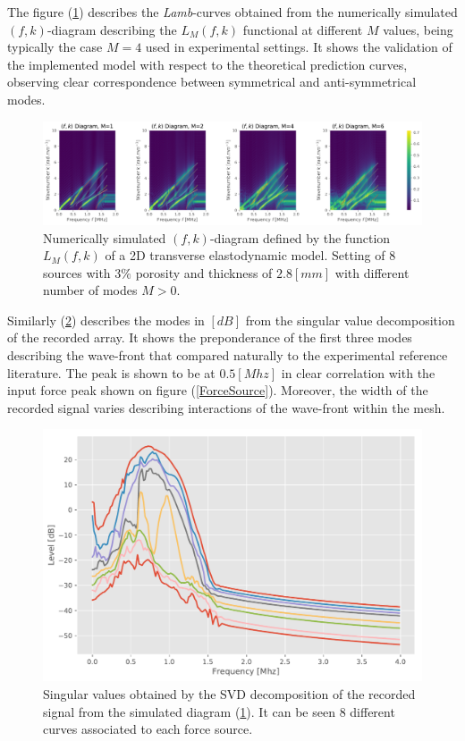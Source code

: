 The figure (\ref{FK-DiagramS8P3M28}) describes the \textit{Lamb}-curves obtained from the numerically simulated $(f,k)$-diagram describing the $L_M(f,k)$ functional at different $M$ values, being typically the case $M=4$ used in experimental settings. It shows the validation of the implemented model with respect to the theoretical prediction curves, observing clear correspondence between symmetrical and anti-symmetrical modes.


\begin{figure}[!h]
	\centering
	\includegraphics[width=\textwidth]{images/TimeMultSous/2DTimeS8P3ElasticFK28M780_y.pdf}
	\caption{Numerically simulated $(f,k)$-diagram defined by the function $L_M(f,k)$ of a 2D transverse elastodynamic model. Setting of 8 sources with $3\%$ porosity and thickness of $2.8 [mm]$ with different number of modes $M>0$.}
	\label{FK-DiagramS8P3M28}
\end{figure}


Similarly (\ref{SVD-S8P3M28}) describes the modes in $[dB]$ from the singular value decomposition of the recorded array. It shows the preponderance of the first three modes describing the wave-front that compared naturally to the experimental reference literature. The peak is shown to be at $0.5 [Mhz]$ in clear correlation with the input force peak shown on figure (\ref{ForceSource}). Moreover, the width of the recorded signal varies describing interactions of the wave-front within the mesh.

\begin{figure}[!h]
	\centering
	\includegraphics[scale=.5]{images/TimeMultSous/2DTimeS8P3Elastic28_SV.pdf}
	\caption{Singular values obtained by the SVD decomposition of the recorded signal from the simulated diagram (\ref{FK-DiagramS8P3M28}). It can be seen 8 different curves associated to each force source.}
	\label{SVD-S8P3M28}
\end{figure}


